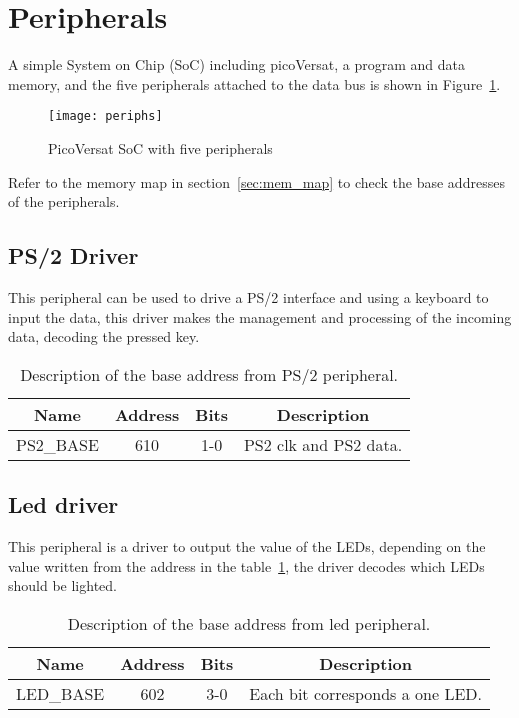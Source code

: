 \section{Peripherals}
\label{sec:periphs}

A simple System on Chip (SoC) including picoVersat, a program and data memory, and the five peripherals
attached to the data bus is shown in Figure~\ref{fig:periphs}.

\begin{figure}[!htbp]
    \centerline{\texttt{[image: periphs]}}
    \vspace{0cm}\caption{PicoVersat SoC with five peripherals}
    \label{fig:periphs}
\end{figure}

Refer to the memory map in section~\ref{sec:mem_map} to check the base addresses
of the peripherals.

\subsection{PS/2 Driver}
This peripheral can be used to drive a PS/2 interface and using a keyboard to input the data, this driver
makes the management and processing of the incoming data, decoding the pressed key.

\begin{table}[h]
\centering
\begin{tabular}{|l|c|c|l|}
\hline
\multicolumn{1}{|c|}{\bf Name} & {\bf Address} & {\bf Bits} & \multicolumn{1}{c|}{\bf Description} \\ 
\hline \hline
\multicolumn{1}{|l|}{PS2\_BASE} & 610 & 1-0 & PS2 clk and PS2 data.\\ 
\hline
\end{tabular}
\caption{Description of the base address from PS/2 peripheral.}
\label{tab:ps2}
\end{table}

\subsection{Led driver}
This peripheral is a driver to output the value of the LEDs, depending on the value written from the address in the table~\ref{tab:ps2}, the driver decodes which LEDs should be lighted.

\begin{table}[h]
\centering
\begin{tabular}{|l|c|c|l|}
\hline
\multicolumn{1}{|c|}{\bf Name} & {\bf Address} & {\bf Bits} & \multicolumn{1}{c|}{\bf Description} \\ 
\hline \hline
\multicolumn{1}{|l|}{LED\_BASE} & 602 & 3-0 & Each bit corresponds a one LED.\\ 
\hline
\end{tabular}
\caption{Description of the base address from led peripheral.}
\label{tab:led}
\end{table}


